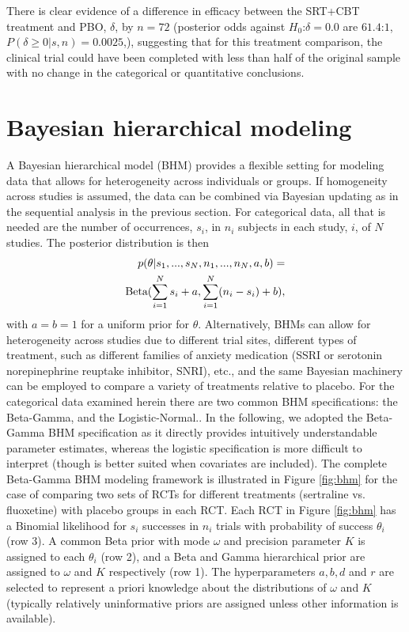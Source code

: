 \documentclass{juliacon}
\begin{document}
\vskip 6pt
There is clear evidence of a difference in efficacy between the SRT+CBT treatment and PBO, $\delta$, by $n=72$ (posterior odds against $H_0$:$\delta=0.0$ are $61.4$:$1$, $P(\delta \ge 0|s,n) = 0.0025$,), suggesting that for this treatment comparison, the clinical trial could have been completed with less than half of the original sample with no change in the categorical or quantitative conclusions.


\section{Bayesian hierarchical modeling}
\label{sec:hbm}
A Bayesian hierarchical model (BHM) provides a flexible setting for modeling data that allows for heterogeneity across individuals or groups. If homogeneity across studies is assumed, the data can be combined via Bayesian updating as in the sequential analysis in the previous section.  For categorical data, all that is needed are the number of occurrences, $s_i$, in $n_i$ subjects in each study, $i$, of $N$ studies. The posterior distribution is then 
\begin{equation}
\begin{split}
p(\theta | s_1,...,s_N, n_1,...,n_N,a,b) = \\ \textnormal{Beta}(\sum_{i=1}^N s_i +a,\sum_{i=1}^N(n_i - s_i) + b),
\end{split}
\label{eq:pbeta}
\end{equation}
with $a=b=1$ for a uniform prior for $\theta$.
\vskip 6pt
Alternatively, BHMs can allow for heterogeneity across studies due to different trial sites, different types of treatment, such as different families of anxiety medication (SSRI or serotonin norepinephrine reuptake inhibitor, SNRI), etc., and the same Bayesian machinery can be employed to compare a variety of treatments relative to placebo. For the categorical data examined herein there are two common BHM specifications: the Beta-Gamma,\cite{Kruschke2014} and the Logistic-Normal.\cite{Mcelreath2015}.  In the following, we adopted the Beta-Gamma BHM specification as it directly provides intuitively understandable parameter estimates, whereas the logistic specification is more difficult to interpret (though is better suited when covariates are included).
\vskip 6pt
The complete Beta-Gamma BHM modeling framework is illustrated in Figure \ref{fig:bhm} for the case of comparing two sets of RCTs for different treatments (sertraline vs. fluoxetine) with placebo groups in each RCT. Each RCT in Figure \ref{fig:bhm} has a Binomial likelihood for $s_i$ successes in $n_i$ trials with probability of success $\theta_i$ (row 3).  A common Beta prior with mode $\omega$ and precision parameter $K$ is assigned to each $\theta_i$ (row 2), and a Beta and Gamma hierarchical prior are assigned to $\omega$ and $K$ respectively (row 1). The hyperparameters $a,b,d$ and $r$ are selected to represent a priori knowledge about the distributions of $\omega$ and $K$ (typically relatively uninformative priors are assigned unless other information is available).
\end{document}
